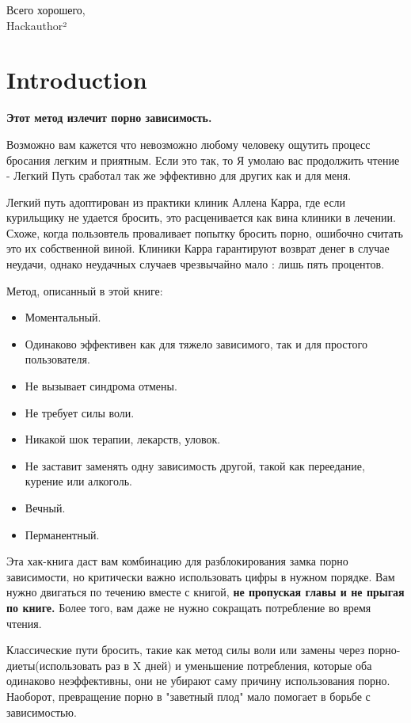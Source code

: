 \documentclass[
]{book}
\begin{document}
Всего хорошего,\\
Hackauthor²

\hypertarget{introduction}{%
\chapter{Introduction}\label{introduction}}

\textbf{Этот метод излечит порно зависимость.}

Возможно вам кажется что невозможно любому человеку ощутить процесс бросания легким и приятным. Если это так, то Я умолаю вас продолжить чтение - Легкий Путь сработал так же эффективно для других как и для меня.

Легкий путь адоптирован из практики клиник Аллена Карра, где если курильщику не удается бросить, это расценивается как вина клиники в лечении. Схоже, когда пользовтель проваливает попытку бросить порно, ошибочно считать это их собственной виной. Клиники Карра гарантируют возврат денег в случае неудачи, однако неудачных случаев чрезвычайно мало : лишь пять процентов.

Метод, описанный в этой книге:

\begin{itemize}
\item
  Моментальный.
\item
  Одинаково эффективен как для тяжело зависимого, так и для простого пользователя.
\item
  Не вызывает синдрома отмены.
\item
  Не требует силы воли.
\item
  Никакой шок терапии, лекарств, уловок.
\item
  Не заставит заменять одну зависимость другой, такой как переедание, курение или алкоголь.
\item
  Вечный.
\item
  Перманентный.
\end{itemize}

Эта хак-книга даст вам комбинацию для разблокирования замка порно зависимости, но критически важно использовать цифры в нужном порядке. Вам нужно двигаться по течению вместе с книгой, \textbf{не пропуская главы и не прыгая по книге.} Более того, вам даже не нужно сокращать потребление во время чтения.

Классические пути бросить, такие как метод силы воли или замены через порно-диеты(использовать раз в X дней) и уменьшение потребления, которые оба одинаково неэффективны, они не убирают саму причину использования порно. Наоборот, превращение порно в "заветный плод" мало помогает в борьбе с зависимостью.
\end{document}
